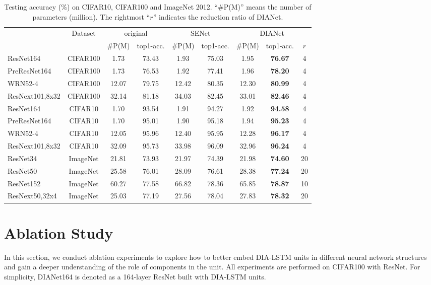 \documentclass[letterpaper]{article} \usepackage{aaai20}  \usepackage{times}  \usepackage{helvet} \usepackage{courier}  \usepackage[hyphens]{url}  \usepackage{graphicx} \urlstyle{rm} \def\UrlFont{\rm}  \usepackage{graphicx}  \frenchspacing  \setlength{\pdfpagewidth}{8.5in}  \setlength{\pdfpageheight}{11in}  \usepackage{color}
\begin{document}
		\begin{table*}[h]
		\centering
		\small
		\begin{tabular}{|l|c|c|c|c|c|c|c|c|}
			\toprule
			& Dataset & \multicolumn{2}{c|}{original} & \multicolumn{2}{c|}{SENet} & \multicolumn{3}{c|}{DIANet} \\
			\cmidrule{3-9}          &       & $\#$P(M) & top1-acc. & $\#$P(M) & top1-acc. & $\#$P(M) & top1-acc. & $r$ \\
			\midrule
			ResNet164 & CIFAR100 & 1.73  & 73.43  & 1.93  & 75.03  & 1.95  & \textbf{76.67 } & 4 \\
			PreResNet164 & CIFAR100 & 1.73  & 76.53  & 1.92  & 77.41  & 1.96  & \textbf{78.20 } & 4 \\
			WRN52-4 & CIFAR100 & 12.07  & 79.75  & 12.42  & 80.35  & 12.30  & \textbf{80.99 } & 4 \\
			ResNext101,8x32 & CIFAR100 & 32.14  & 81.18  & 34.03  & 82.45  & 33.01  & \textbf{82.46 } & 4 \\
			\midrule
			ResNet164 & CIFAR10 & 1.70  & 93.54  & 1.91  & 94.27  & 1.92  & \textbf{94.58 } & 4 \\
			PreResNet164 & CIFAR10 & 1.70  & 95.01  & 1.90  & 95.18  & 1.94  & \textbf{95.23 } & 4 \\
			WRN52-4 & CIFAR10 & 12.05  & 95.96  & 12.40  & 95.95  & 12.28  & \textbf{96.17 } & 4 \\
			ResNext101,8x32 & CIFAR10 & 32.09  & 95.73  & 33.98  & 96.09  & 32.96  & \textbf{96.24 } & 4 \\
			\midrule
			ResNet34 & ImageNet & 21.81     & 73.93  & 21.97    & 74.39  & 21.98     & \textbf{74.60 } & 20 \\
			ResNet50 & ImageNet & 25.58     & 76.01  & 28.09    & 76.61  &  28.38   & \textbf{77.24 } & 20 \\
			ResNet152 & ImageNet & 60.27     & 77.58  & 66.82     & 78.36  &  65.85    & \textbf{78.87 } & 10 \\
			ResNext50,32x4 & ImageNet & 25.03     & 77.19  &  27.56    & 78.04  &  27.83    & \textbf{78.32 } & 20 \\
			\bottomrule
		\end{tabular}\caption{Testing accuracy (\%) on CIFAR10, CIFAR100 and ImageNet 2012. ``$\#$P(M)'' means the number of parameters (million). The rightmost ``$r$'' indicates the reduction ratio of DIANet.}
		\label{classification result}\end{table*}

	\section{Ablation Study}
	\label{ablationstudy}
	In this section, we conduct ablation experiments to explore how to better embed DIA-LSTM units in different neural network structures and gain a deeper understanding of the role of components in the unit. All experiments are performed on CIFAR100 with ResNet. For simplicity, DIANet164 is denoted as a 164-layer ResNet built with DIA-LSTM units.	
	
\end{document}
